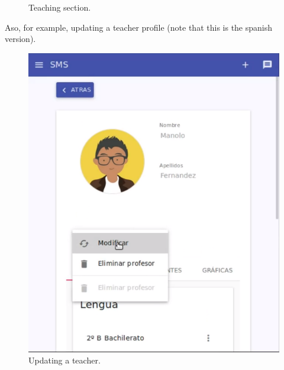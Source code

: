 \begin{figure}[H]
\begin{minipage}{.5\textwidth}
  \caption{Teaching section.}
\end{minipage}
\end{figure}

\noindent Aso, for example, updating a teacher profile (note that this is
the spanish version).

\begin{figure}[H]
\centering
\begin{minipage}{.5\textwidth}
  \centering
  \includegraphics[scale=0.3]{img/snaps/teacher_profile_update.png}
  \caption{Updating a teacher.}
\end{minipage}%
\begin{minipage}{.5\textwidth}
  \centering

\end{minipage}
\end{figure}
